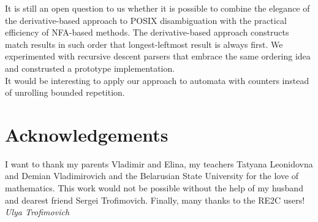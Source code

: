 \documentclass[AMA,STIX1COL]{WileyNJD-v2}
\begin{document}
It is still an open question to us
whether it is possible to combine the elegance of the derivative-based approach to POSIX disambiguation
with the practical efficiency of NFA-based methods.
%
The derivative-based approach constructs match results in such order that longest-leftmost result is always first.
%
We experimented with recursive descent parsers that embrace the same ordering idea
and construsted a prototype implementation.
\\

It would be interesting to apply our approach to automata with counters
instead of unrolling bounded repetition.


\section*{Acknowledgements}

I want to thank my parents Vladimir and Elina,
my teachers Tatyana Leonidovna and Demian Vladimirovich
and the Belarusian State University
for the love of mathematics.
This work would not be possible without the help of my husband and dearest friend Sergei Trofimovich.
Finally, many thanks to the RE2C users!
\null\hfill\textit{Ulya Trofimovich}
\end{document}
